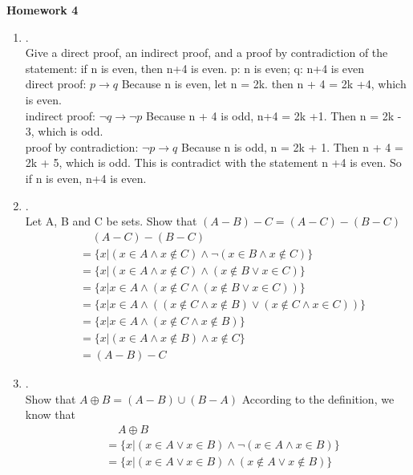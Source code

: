 \documentclass{article}
\theoremstyle{definition}
\theoremstyle{plain}
\begin{document}
\begin{center} \bf \LARGE Homework 4\\
\end{center}


\begin {enumerate}[itemindent=30pt,label=\bf Exercise {\arabic*}:]

\item .\\
Give a direct proof, an indirect proof, and a proof by contradiction of the statement: if n is even, then n+4 is even.
\subitem p: n is even; q: n+4 is even\\
\subitem direct proof: $p \to q$
\subitem Because n is even, let n = 2k. then n + 4 = 2k +4, which is even.\\
\subitem indirect proof: $\neg q \to \neg p$
\subitem Because n + 4 is odd, n+4 = 2k +1. Then n = 2k - 3, which is odd.\\
\subitem proof by contradiction: $\neg p \to q$ 
\subitem Because n is odd, n = 2k + 1. Then n + 4 = 2k + 5, which is odd. This is contradict with the statement n +4 is even. So if n is even, n+4 is even.
\item .\\
Let A, B and C be sets. Show that $(A-B)-C = (A-C)-(B-C)$
\begin{align*}
	&\;\;\;\;(A-C)-(B-C) \\
	&=\{x|(x \in A \land x \notin C) \land \neg (x \in B \land x \notin C) \}\\
	&=\{x|(x \in A \land x \notin C) \land (x \notin B \lor x \in C) \}\\
	&=\{x|x \in A \land (x \notin C \land (x \notin B \lor x \in C)) \}\\	
	&=\{x|x \in A \land ((x \notin C \land x \notin B) \lor (x \notin C \land x \in C)) \}\\	
	&=\{x|x \in A \land (x \notin C \land x \notin B)\}\\
	&=\{x|(x \in A \land x \notin B) \land x \notin C\}\\	
	&=(A-B)-C
\end{align*}
\item .\\
Show that $A \oplus B = (A - B) \cup (B - A)$
\subitem According to the definition, we know that
\begin{align*}
	&\;\;\;\;A \oplus B\\
	&=\{x|(x \in A \lor x \in B) \land \neg (x \in A \land x \in B)\}\\
	&=\{x|(x \in A \lor x \in B) \land (x \notin A \lor x \notin B)\}\\

\end{align*}
\end{enumerate}
\end{document}
